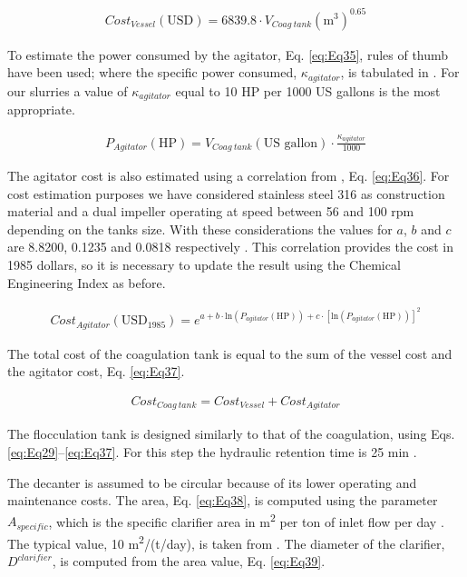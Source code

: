 \begin{refsection}[referencesCh2]
\begin{align}
	{Cost}_{Vessel} \left( \text{USD} \right) = 6839.8 \cdot {V}_{Coag \ tank}{\left( {\text{m}^{3}} \right)^{0.65}} \label{eq:Eq34}
\end{align}

To estimate the power consumed by the agitator, Eq. \ref{eq:Eq35}, rules of thumb have been used; where the specific power consumed, $\kappa_{agitator}$, is tabulated in \citet{walas1988chemical}. For our slurries a value of $\kappa_{agitator}$ equal to 10 HP per 1000 US gallons is the most appropriate.

\begin{align}
	P_{Agitator}\left( \text{HP} \right) = V_{Coag \ tank} \left( {\text{US gallon}} \right) \cdot \frac{\kappa_{agitator}}{1000} \label{eq:Eq35}
\end{align}

The agitator cost is also estimated using a correlation from \citet{walas1988chemical}, Eq. \ref{eq:Eq36}. For cost estimation purposes we have considered stainless steel 316 as construction material and a dual impeller operating at speed between 56 and 100 rpm depending on the tanks size. With these considerations the values for $a$, $b$ and $c$ are 8.8200, 0.1235 and 0.0818 respectively \citep{walas1988chemical}. This correlation provides the cost in 1985 dollars, so it is necessary to update the result using the Chemical Engineering Index as before.

\begin{align}
	Cost_{Agitator} \left( \text{USD}_{1985}  \right) = {e^{a + b \cdot {\text{ln}}\left( {{P_{agitator}}\left( \text{HP} \right)} \right) + c \cdot {\left[ \text{ln}\left( {P_{agitator}\left( \text{HP} \right)} \right) \right] }^2}} \label{eq:Eq36}
\end{align}

The total cost of the coagulation tank is equal to the sum of the vessel cost and the agitator cost, Eq. \ref{eq:Eq37}.

\begin{align}
	{Cost}_{Coag \ tank} = Cost_{Vessel} + Cost_{Agitator} \label{eq:Eq37}
\end{align}

The flocculation tank is designed similarly to that of the coagulation, using Eqs. \ref{eq:Eq29}–\ref{eq:Eq37}. For this step the hydraulic retention time is 25 min \citep{zhou2008enhanced}.

The decanter is assumed to be circular because of its lower operating and maintenance costs. The area, Eq. \ref{eq:Eq38}, is computed using the parameter $A_{specific}$, which is the specific clarifier area in m\textsuperscript{2} per ton of inlet flow per day \citep{wef2005wef}. The typical value, 10 m\textsuperscript{2}/(t/day), is taken from \citet{green2008perry}. The diameter of the clarifier, $D^{clarifier}$, is computed from the area value, Eq. \ref{eq:Eq39}.


\end{refsection}
